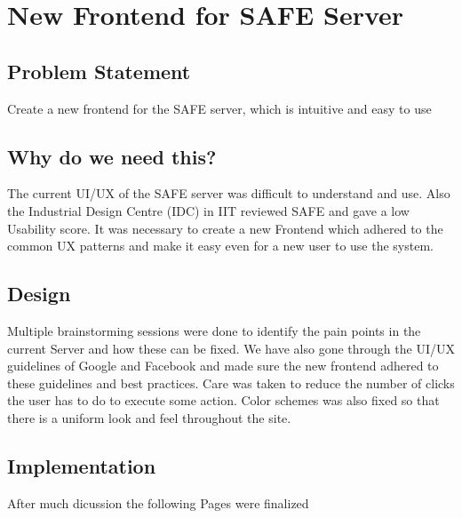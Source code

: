 \clearpage
\section{New Frontend for SAFE Server} 
\hspace{0.5cm} 

\subsection{Problem Statement}
	Create a new frontend for the SAFE server, which is intuitive and easy to use

\subsection{Why do we need this?}
	The current UI/UX of the SAFE server was difficult to understand and use. Also the Industrial Design Centre (IDC) in IIT reviewed SAFE and gave a low Usability score. It was necessary to create a new Frontend which adhered to the common UX patterns and make it easy even for a new user to use the system. 

\subsection{Design}
	Multiple brainstorming sessions were done to identify the pain points in the current Server and how these can be fixed. We have also gone through the UI/UX guidelines of Google and Facebook and made sure the new frontend adhered to these guidelines and best practices. Care was taken to reduce the number of clicks the user has to do to execute some action. Color schemes was also fixed so that there is a uniform look and feel throughout the site.

\subsection{Implementation}
	After much dicussion the following Pages were finalized

